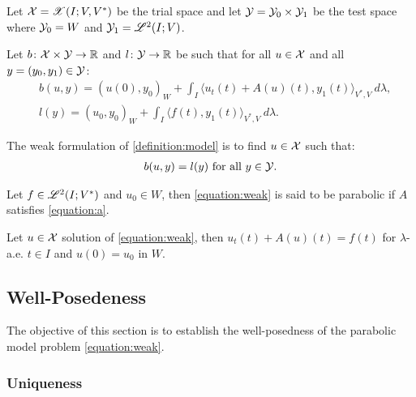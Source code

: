 \begin{definition}
    Let $\mathcal{X} = \mathscr{X}(I; V, V^*)$ be the trial space and let $\mathcal{Y} = \mathcal{Y}_0 \times \mathcal{Y}_1$ be the test space where $\mathcal{Y}_0 = W$ and $\mathcal{Y}_1 = \mathscr{L}^{2}(I; V)$.
\end{definition}

\begin{definition}[$b$ and $l$]
    Let $b \colon \mathcal{X} \times \mathcal{Y} \rightarrow \mathbb{R}$ and $l \colon \mathcal{Y} \rightarrow \mathbb{R}$ be such that for all $u \in \mathcal{X}$ and all $y = (y_0, y_1) \in \mathcal{Y}$:
    \begin{align}
        & b(u, y) = \left( u(0), y_0 \right)_W + \int_I \langle u_t(t) + A(u)(t), y_1(t) \rangle_{V^*, V} ~ d \lambda, \\
        & l(y) = \left( u_0, y_0 \right)_W + \int_I \langle f(t), y_1(t) \rangle_{V^*, V} ~ d \lambda.
    \end{align}
\end{definition}

\begin{definition}
    The weak formulation of \ref{definition:model} is to find $u \in \mathcal{X}$ such that:
    \begin{gather}
        b(u, y) = l(y) \text{ for all } y \in \mathcal{Y}. \label{equation:weak}
    \end{gather}
\end{definition}

\begin{definition}
    Let $f \in \mathscr{L}^{2}(I; V^*)$ and $u_0 \in W$, then \eqref{equation:weak} is said to be parabolic if $A$ satisfies \eqref{equation:a}.
\end{definition}

\begin{lemma}
    Let $u \in \mathcal{X}$ solution of \eqref{equation:weak}, then $u_t(t) + A(u)(t) = f(t)$ for $\lambda$-a.e. $t \in I$ and $u(0) = u_0$ in $W$.
\end{lemma}

\newpage
\subsection{Well-Posedeness}

The objective of this section is to establish the well-posedness of the parabolic model problem \eqref{equation:weak}.

\subsubsection{Uniqueness}

